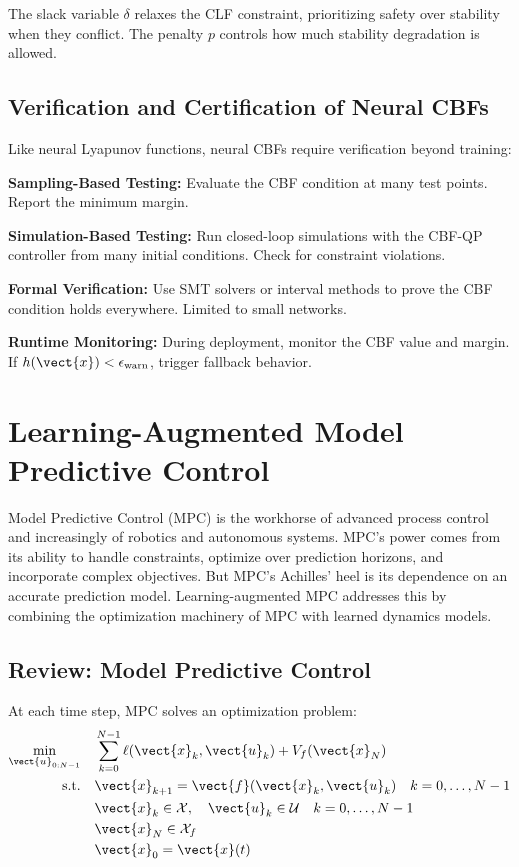 The slack variable $\delta$ relaxes the CLF constraint, prioritizing safety over stability when they conflict. The penalty $p$ controls how much stability degradation is allowed.

\subsection{Verification and Certification of Neural CBFs}

Like neural Lyapunov functions, neural CBFs require verification beyond training:

\textbf{Sampling-Based Testing:} Evaluate the CBF condition at many test points. Report the minimum margin.

\textbf{Simulation-Based Testing:} Run closed-loop simulations with the CBF-QP controller from many initial conditions. Check for constraint violations.

\textbf{Formal Verification:} Use SMT solvers or interval methods to prove the CBF condition holds everywhere. Limited to small networks.

\textbf{Runtime Monitoring:} During deployment, monitor the CBF value and margin. If $h(\vect{x}) < \epsilon_{\text{warn}}$, trigger fallback behavior.

\section{Learning-Augmented Model Predictive Control}
\label{sec:learning_mpc}

Model Predictive Control (MPC) is the workhorse of advanced process control and increasingly of robotics and autonomous systems. MPC's power comes from its ability to handle constraints, optimize over prediction horizons, and incorporate complex objectives. But MPC's Achilles' heel is its dependence on an accurate prediction model. Learning-augmented MPC addresses this by combining the optimization machinery of MPC with learned dynamics models.

\subsection{Review: Model Predictive Control}

At each time step, MPC solves an optimization problem:
\begin{align}
\min_{\vect{u}_{0:N-1}} \quad & \sum_{k=0}^{N-1} \ell(\vect{x}_k, \vect{u}_k) + V_f(\vect{x}_N) \label{eq:mpc_cost}\\
\text{s.t.} \quad & \vect{x}_{k+1} = \vect{f}(\vect{x}_k, \vect{u}_k) \quad k = 0, \ldots, N-1 \label{eq:mpc_dynamics}\\
& \vect{x}_k \in \mathcal{X}, \quad \vect{u}_k \in \mathcal{U} \quad k = 0, \ldots, N-1 \label{eq:mpc_constraints}\\
& \vect{x}_N \in \mathcal{X}_f \label{eq:mpc_terminal}\\
& \vect{x}_0 = \vect{x}(t) \label{eq:mpc_initial}
\end{align}

